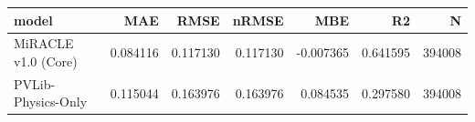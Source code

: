 \begin{tabular}{lrrrrrr}
\toprule
model & MAE & RMSE & nRMSE & MBE & R2 & N \\
\midrule
MiRACLE v1.0 (Core) & 0.084116 & 0.117130 & 0.117130 & -0.007365 & 0.641595 & 394008 \\
PVLib-Physics-Only & 0.115044 & 0.163976 & 0.163976 & 0.084535 & 0.297580 & 394008 \\
\bottomrule
\end{tabular}
